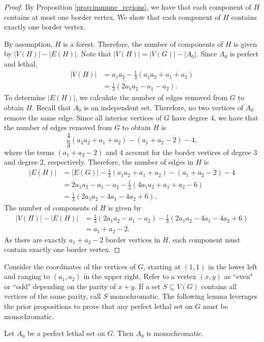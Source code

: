 \begin{proof}
By Proposition \ref{prop:immune_regions}, we have that each component of $H$ contains at most one border vertex. We show that each component of $H$ contains exactly one border vertex.

By assumption, $H$ is a forest. Therefore, the number of components of $H$ is given by $|V(H)| - |E(H)|$. Note that $|V(H)| = |V(G)| - |A_0|$. Since $A_0$ is perfect and lethal,
\begin{align*}
|V(H)| &= a_1a_2 - \frac{1}{3}(a_1a_2+a_1+a_2) \\
&= \frac{1}{3}(2a_1a_2-a_1-a_2).
\end{align*}
To determine $|E(H)|$, we calculate the number of edges removed from $G$ to obtain $H$. Recall that $A_0$ is an independent set. Therefore, no two vertices of $A_0$ remove the same edge. Since all interior vertices of $G$ have degree 4, we have that the number of edges removed from $G$ to obtain $H$ is
$$\frac{4}{3} \left(a_1a_2+a_1+a_2 \right) - (a_1+a_2-2) - 4,$$
where the terms $(a_1+a_2-2)$ and $4$ account for the border vertices of degree $3$ and degree $2$, respectively. Therefore, the number of edges in $H$ is
\begin{align*}
|E(H)| &= |E(G)| - \frac{4}{3} \left(a_1a_2+a_1+a_2 \right) - (a_1+a_2-2) - 4 \\
&= 2a_1a_2 -a_1 -a_2 - \frac{1}{3}(4a_1a_2+a_1+a_2-6) \\
&= \frac{1}{3}(2a_1a_2-4a_1-4a_2+6).
\end{align*}
The number of components of $H$ is given by
\begin{align*}
|V(H)| -|E(H)| &= \frac{1}{3}(2a_1a_2-a_1-a_2) - \frac{1}{3}(2a_1a_2-4a_1-4a_2+6) \\
&= a_1 + a_2 -2.
\end{align*}
As there are exactly $a_1 + a_2 - 2$ border vertices in $H$, each component must contain exactly one border vertex.
\end{proof}

Consider the coordinates of the vertices of $G$, starting at $(1,1)$ in the lower left and ranging to $(a_1,a_2)$ in the upper right. Refer to a vertex $(x,y)$ as ``even" or ``odd" depending on the parity of $x+y$. If a set $S \subseteq V(G)$ contains all vertices of the same parity, call $S$ monochromatic. The following lemma leverages the prior propositions to prove that any perfect lethal set on $G$ must be monochromatic.

\begin{lem}
Let $A_0$ be a perfect lethal set on $G$. Then $A_0$ is monochromatic.
\end{lem}


